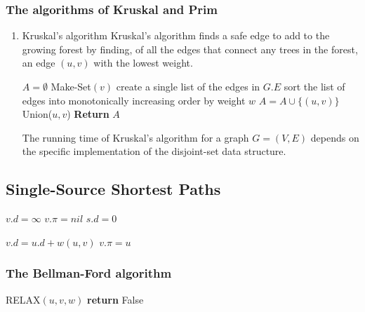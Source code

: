 \documentclass[11pt]{article}
\begin{document}
\subsubsection{The algorithms of Kruskal and Prim}
\label{sec:org7fbb10d}
\begin{enumerate}
\item Kruskal's algorithm
\label{sec:orgf4bc2e1}
Kruskal's algorithm finds a safe edge to add to the growing forest by finding, of all the edges
that connect any trees in the forest, an edge \((u,v)\) with the lowest weight.
\begin{algorithmic}[1]
\State \(A=\emptyset\)
    \State Make-Set\((v)\)
\EndFor
\State create a single list of the edges in \(G.E\)
\State sort the list of edges into monotonically increasing order by weight \(w\)
        \State \(A=A\cup\{(u,v)\}\)
        \State Union(\(u,v\))
    \EndIf
\EndFor
\State \textbf{Return} \(A\)
\EndProcedure
\end{algorithmic}

The running time of Kruskal's algorithm for a graph \(G=(V,E)\) depends on the specific
implementation of the disjoint-set data structure.
\end{enumerate}

\subsection{Single-Source Shortest Paths}
\label{sec:org648f66e}
\begin{algorithmic}[1]
    \State \(v.d=\infty\)
    \State \(v.\pi=nil\)
\EndFor
\State \(s.d=0\)
\EndProcedure
\end{algorithmic}

\begin{algorithmic}[1]
    \State \(v.d=u.d+w(u,v)\)
    \State \(v.\pi=u\)
\EndIf
\EndProcedure
\end{algorithmic}

\subsubsection{The Bellman-Ford algorithm}
\label{sec:org74e2030}
\begin{algorithmic}[1]
            \State RELAX\((u,v,w)\)
        \EndFor
    \EndFor
            \State \textbf{return }False
        \EndIf
    \EndFor
\EndProcedure
\end{algorithmic}
\end{document}
